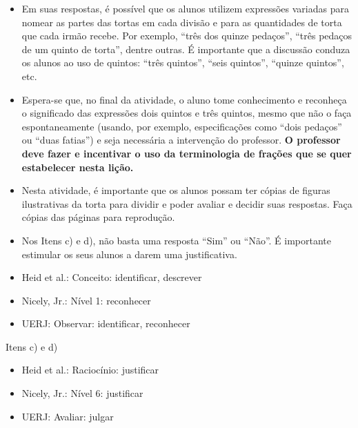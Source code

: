\begin{multicols}{2}
\begin{itemize} %
    \item       Em suas respostas, é possível que os alunos utilizem expressões variadas para nomear as partes das tortas em cada divisão e para as quantidades de torta que cada irmão recebe. Por exemplo,       ``três dos quinze pedaços'',       ``três pedaços de um quinto de torta'', dentre outras. É importante que a discussão conduza os alunos ao uso de quintos:       ``três quintos'',       ``seis quintos'',       ``quinze quintos'', etc.
    \item       Espera-se que, no final da atividade, o aluno tome conhecimento e reconheça o significado das expressões dois quintos e três quintos, mesmo que não o faça espontaneamente (usando, por exemplo, especificações como       ``dois pedaços''     ou       ``duas fatias'') e seja necessária a intervenção do professor. {\bf O professor deve fazer e incentivar o uso da terminologia de frações que se quer estabelecer nesta lição.}
    \item       Nesta atividade, é importante que os alunos possam ter cópias de figuras ilustrativas da torta para dividir e poder avaliar e decidir suas respostas. Faça cópias das páginas para reprodução.
    \item       Nos Itens c) e d), não basta uma resposta       ``Sim''     ou       ``Não''. É importante estimular os seus alunos a darem uma justificativa.
\end{itemize} %



  \vspace{.1cm}

 \vspace{.1cm}
\begin{itemize} %
    \item       Heid et al.: Conceito: identificar, descrever
    \item       Nicely, Jr.: Nível 1: reconhecer
    \item       UERJ: Observar: identificar, reconhecer
\end{itemize} %

  Itens c) e d)
\begin{itemize} %
    \item       Heid et al.: Raciocínio: justificar
    \item       Nicely, Jr.: Nível 6: justificar
    \item       UERJ: Avaliar: julgar
\end{itemize} %


\end{multicols}
